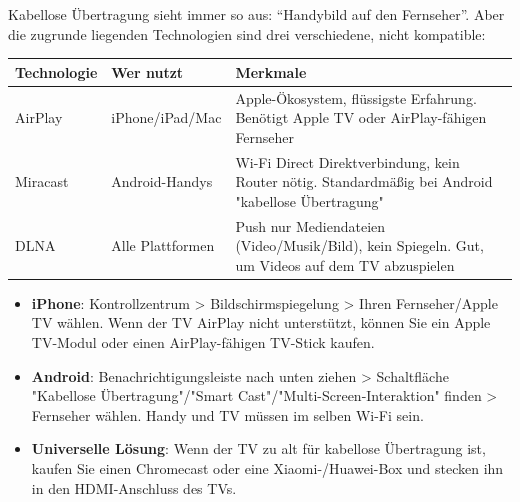 


Kabellose Übertragung sieht immer so aus: “Handybild auf den Fernseher”. Aber die zugrunde liegenden Technologien sind drei verschiedene, nicht kompatible:

\begin{center}
\begin{tabularx}{\linewidth}{|X|X|X|}
\hline
\textbf{Technologie} & \textbf{Wer nutzt} & \textbf{Merkmale} \tabularnewline
\hline
AirPlay & iPhone/iPad/Mac & Apple-Ökosystem, flüssigste Erfahrung. Benötigt Apple TV oder AirPlay-fähigen Fernseher \tabularnewline
Miracast & Android-Handys & Wi-Fi Direct Direktverbindung, kein Router nötig. Standardmäßig bei Android "kabellose Übertragung" \tabularnewline
DLNA & Alle Plattformen & Push nur Mediendateien (Video/Musik/Bild), kein Spiegeln. Gut, um Videos auf dem TV abzuspielen \tabularnewline
\hline
\end{tabularx}
\end{center}


\begin{itemize}
  \item \textbf{iPhone}: Kontrollzentrum > Bildschirmspiegelung > Ihren Fernseher/Apple TV wählen. Wenn der TV AirPlay nicht unterstützt, können Sie ein Apple TV-Modul oder einen AirPlay-fähigen TV-Stick kaufen.
  \item \textbf{Android}: Benachrichtigungsleiste nach unten ziehen > Schaltfläche "Kabellose Übertragung"/"Smart Cast"/"Multi-Screen-Interaktion" finden > Fernseher wählen. Handy und TV müssen im selben Wi-Fi sein.
  \item \textbf{Universelle Lösung}: Wenn der TV zu alt für kabellose Übertragung ist, kaufen Sie einen Chromecast oder eine Xiaomi-/Huawei-Box und stecken ihn in den HDMI-Anschluss des TVs.
\end{itemize}


